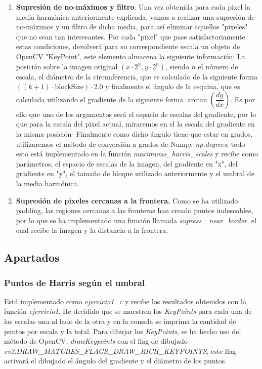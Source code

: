 \documentclass{article}
\begin{document}
\begin{enumerate}
	\item \textbf{Supresión de no-máximos y filtro}. Una vez obtenida para cada pixel la media harmónica anteriormente explicada, vamos a realizar una supresión de no-máximos y un filtro de dicha media, para así eliminar aquellos "pixeles" que no sean tan interesantes. Por cada "pixel" que pase satisfactoriamente estas condiciones, devolverá para su correspondiente escala un objeto de OpenCV "KeyPoint", este elemento almacena la siguiente información: La posición sobre la imagen original $(x\cdot 2^n, y\cdot 2^n)$, siendo $n$ el número de escala, el diámetro de la circunferencia, que es calculado de la siguiente forma $((k+1)\cdot \text{blockSize})\cdot 2.0 $ y finalmente el ángulo de la esquina, que es calculada utilizando el gradiente de la siguiente forma $\arctan(\dfrac{dy}{dx})$. Es por ello que uno de los argumentos será el espacio de escalas del gradiente, por lo que para la escala del pixel actual, miraremos en el la escala del gradiente en la misma posición- Finalmente como dicho ángulo tiene que estar en grados, utilizaremos el método de conversión a grados de Numpy \textit{np.degrees}, todo esto está implementado en la función \textit{maximums\_harris\_scales} y recibe como parámetros, el espacio de escalas de la imagen, del gradiente en "x", del gradiente en "y", el tamaño de bloque utilizado anteriormente y el umbral de la media harmónica.
	\item \textbf{Supresión de pixeles cercanas a la frontera.} Como se ha utilizado padding, las regiones cercanas a las fronteras han creado puntos \newline indeseables, por lo que se ha implementado una función llamada \textit{supress  \_near\_border}, el cual recibe la imagen y la distancia a la frontera.
\end{enumerate}
\subsection{Apartados}
\subsubsection{Puntos de Harris según el umbral}
Está implementado como \textit{ejercicio1\_c} y recibe los resultados obtenidos con la función \textit{ejercicio1}. He decidido que se muestren los \textit{KeyPoints} para cada una de las escalas una al lado de la otra y en la consola se imprima la cantidad de puntos por escala y la total. Para dibujar los \textit{KeyPoints}, se ha hecho uso del método de OpenCV, \textit{drawKeypoints} con el flag de dibujado \textit{cv2.DRAW\_MATCHES\_FLAGS\_DRAW\_RICH\_KEYPOINTS}, este flag activará el dibujado el ángulo del gradiente y el diámetro de los puntos.
\newpage
\end{document}
